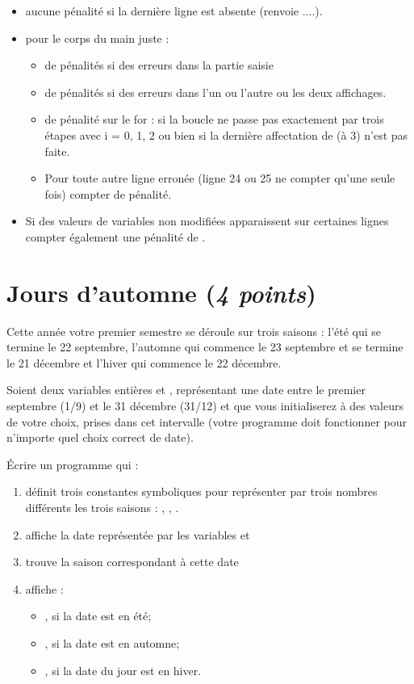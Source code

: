 \begin{correction}
\begin{baremeenv}
\begin{itemize}
      \item aucune pénalité si la dernière ligne est absente (renvoie
        ....).
      \item {} pour le corps du main juste :
        \begin{itemize}
        \item {} de pénalités si des erreurs dans la partie saisie
        \item {}  de pénalités si des erreurs dans l'un ou l'autre
          ou les deux affichages.
        \item {} de pénalité sur le for : si la boucle ne passe pas exactement
          par trois étapes avec i = 0, 1, 2 ou bien si la dernière
          affectation de  (à 3) n'est pas faite.
        \item Pour toute autre ligne erronée (ligne 24 ou 25 ne
          compter qu'une seule fois)
          compter  de pénalité.
        \end{itemize}
     \item Si des valeurs de variables non modifiées apparaissent sur
        certaines lignes compter également une pénalité de .
      \end{itemize}
    \end{baremeenv}
\end{correction}

\section{Jours d'automne (\textit{4 points})}

Cette année votre premier semestre se déroule sur trois saisons :
l'été qui se termine le 22 septembre, l'automne qui commence le 23
septembre et se termine le 21 décembre et l'hiver qui commence le 22
décembre.

Soient deux variables entières  et , représentant une
date entre le premier septembre (1/9) et le 31 décembre (31/12) et que
vous initialiserez à des valeurs de votre choix, prises dans cet
intervalle (votre programme doit fonctionner pour n'importe quel
choix correct de date).

\question Écrire un programme qui :
\begin{enumerate}
\item définit trois constantes symboliques pour représenter par trois
  nombres différents les trois
  saisons : , , . 
\item affiche la date représentée par les variables  et  
\item trouve la saison correspondant à cette date 
\item affiche : 
\begin{itemize}
\item {}, si la date est en été;
\item {}, si la date est en automne;
\item {}, si la date du jour est en hiver.
\end{itemize}
\end{enumerate}


